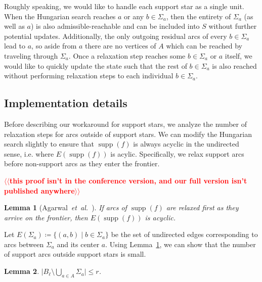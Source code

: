 \documentclass[11pt]{article}
\makeatletter
\def\etal{\textit{et~al.}}
\def\abs#1{\mathopen| #1 \mathclose|}		%
\def\supp{\operatorname{supp}}
\theoremstyle{plain}
\newtheorem{lemma}{Lemma}[section]
\numberwithin{figure}{section}
\def\n@te#1{\textsf{\boldmath \textbf{$\langle\!\langle$#1$\rangle\!\rangle$}}\leavevmode}
\def\note#1{\textcolor{red}{\n@te{#1}}}
\makeatother
\begin{document}
Roughly speaking, we would like to handle each support star as a single unit.
When the Hungarian search reaches $a$ or any $b \in \Sigma_a$, then the
entirety of $\Sigma_a$ (as well as $a$) is also admissible-reachable and can be
included into $S$ without further potential updates.
Additionally, the only outgoing residual arcs of every $b \in \Sigma_a$ lead to
$a$, so aside from $a$ there are no vertices of $A$ which can be reached by
traveling through $\Sigma_a$.
Once a relaxation step reaches some $b \in \Sigma_a$ or $a$ itself, we would
like to quickly update the state such that the rest of $b \in \Sigma_a$ is also
reached without performing relaxation steps to each individual
$b \in \Sigma_a$.

\subsection{Implementation details}

Before describing our workaround for support stars, we analyze the number of
relaxation steps for arcs outside of support stars.
We can modify the Hungarian search slightly to ensure that $\supp(f)$ is always
acyclic in the undirected sense, i.e. where $E(\supp(f))$ is acylic.
Specifically, we relax support arcs before non-support arcs as they enter the
frontier.

\note{this proof isn't in the conference version, and our full version isn't published anywhere}
\begin{lemma}[Agarwal~\etal~\cite{AFPVX17}]
\label{lemma:orlin_acyclic}
If arcs of $\supp(f)$ are relaxed first as they arrive on the frontier, then
$E(\supp(f))$ is acyclic.
\end{lemma}

Let $E(\Sigma_a) \coloneqq \{(a, b) \mid b \in \Sigma_a\}$ be the set of
undirected edges corresponding to arcs between $\Sigma_a$ and its center $a$.
Using Lemma~\ref{lemma:orlin_acyclic}, we can show that the number of support
arcs outside support stars is small.

\begin{lemma}
\label{lemma:no_star_support_size}
$\abs{B_\ell \setminus \bigcup_{a \in A} \Sigma_a} \leq r$.
\end{lemma}
\end{document}
